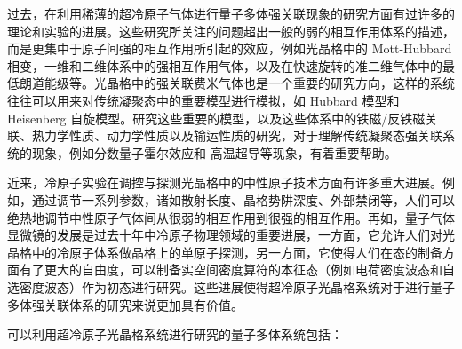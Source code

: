 过去，在利用稀薄的超冷原子气体进行量子多体强关联现象的研究方面有过许多的理论和实验的进展\cite{bloch2008}。这些研究所关注的问题超出一般的弱的相互作用体系的描述，而是更集中于原子间强的相互作用所引起的效应，例如光晶格中的 Mott-Hubbard 相变，一维和二维体系中的强相互作用气体，以及在快速旋转的准二维气体中的最低朗道能级等。光晶格中的强关联费米气体也是一个重要的研究方向，这样的系统往往可以用来对传统凝聚态中的重要模型进行模拟，如 Hubbard 模型和 Heisenberg 自旋模型。研究这些重要的模型，以及这些体系中的铁磁/反铁磁关联、热力学性质、动力学性质以及输运性质的研究，对于理解传统凝聚态强关联系统的现象，例如分数量子霍尔效应和 高温超导等现象，有着重要帮助\cite{nagaosa}。

近来，冷原子实验在调控与探测光晶格中的中性原子技术方面有许多重大进展。例如，通过调节一系列参数，诸如散射长度、晶格势阱深度、外部禁闭等，人们可以绝热地调节中性原子气体间从很弱的相互作用到很强的相互作用。再如，量子气体显微镜的发展是过去十年中冷原子物理领域的重要进展\cite{microscope1,microscope2,microscope3,microscope4,microscope5,microscope6}，一方面，它允许人们对光晶格中的冷原子体系做晶格上的单原子探测，另一方面，它使得人们在态的制备方面有了更大的自由度，可以制备实空间密度算符的本征态（例如电荷密度波态和自选密度波态）作为初态进行研究。这些进展使得超冷原子光晶格系统对于进行量子多体强关联体系的研究来说更加具有价值。

可以利用超冷原子光晶格系统进行研究的量子多体系统包括\cite{olbook}：

